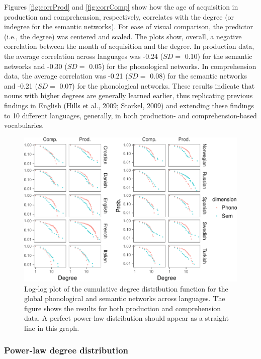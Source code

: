 \documentclass[english,floatsintext,man]{apa6}
\theoremstyle{definition}
\theoremstyle{definition}
\theoremstyle{definition}
\theoremstyle{remark}
\begin{document}
Figures \ref{fig:corrProd} and \ref{fig:corrComp} show how the age of
acquisition in production and comprehension, respectively, correlates
with the degree (or indegree for the semantic networks). For ease of
visual comparison, the predictor (i.e., the degree) was centered and
scaled. The plots show, overall, a negative correlation between the
month of acquisition and the degree. In production data, the average
correlation across languages was -0.24 (\(SD=\) 0.10) for the semantic
networks and -0.30 (\(SD=\) 0.05) for the phonological networks. In
comprehension data, the average correlation was -0.21 (\(SD=\) 0.08) for
the semantic networks and -0.21 (\(SD=\) 0.07) for the phonological
networks. These results indicate that nouns with higher degrees are
generally learned earlier, thus replicating previous findings in English
(Hills et al., 2009; Storkel, 2009) and extending these findings to 10
different languages, generally, in both production- and
comprehension-based vocabularies.

\begin{figure}[!h]
\includegraphics[width=\textwidth]{ms_files/figure-latex/degreeDist-1} \caption{Log-log plot of the cumulative degree distribution function for the global phonological and semantic networks across languages. The figure shows the results for both production and comprehension data. A perfect power-law distribution should appear as a straight line in this graph.}\label{fig:degreeDist}
\end{figure}

\subsubsection{Power-law degree
distribution}\label{power-law-degree-distribution}
\end{document}
